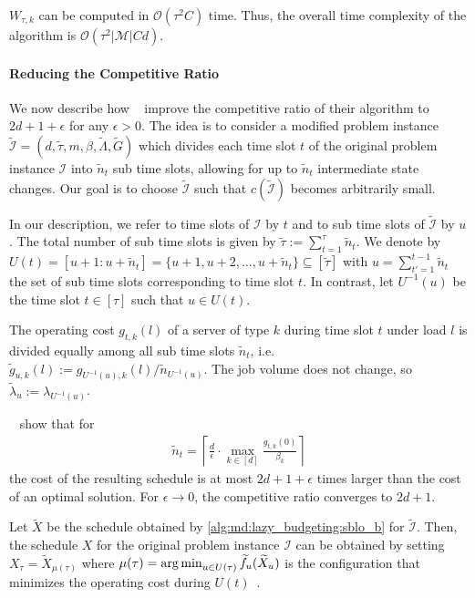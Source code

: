 $W_{\tau,k}$ can be computed in $\mathcal{O}(\tau^2 C)$ time. Thus, the overall time complexity of the algorithm is $\mathcal{O}(\tau^2 |\mathcal{M}| C d)$.

\paragraph{Reducing the Competitive Ratio}

We now describe how \citeauthor{Albers2021_2}~\cite{Albers2021_2} improve the competitive ratio of their algorithm to $2d + 1 + \epsilon$ for any $\epsilon > 0$. The idea is to consider a modified problem instance $\widetilde{\mathcal{I}} = (d, \widetilde{\tau}, m, \beta, \widetilde{\Lambda}, \widetilde{G})$ which divides each time slot $t$ of the original problem instance $\mathcal{I}$ into $\widetilde{n}_t$ sub time slots, allowing for up to $\widetilde{n}_t$ intermediate state changes. Our goal is to choose $\widetilde{\mathcal{I}}$ such that $c(\widetilde{\mathcal{I}})$ becomes arbitrarily small.

In our description, we refer to time slots of $\mathcal{I}$ by $t$ and to sub time slots of $\widetilde{\mathcal{I}}$ by $u$. The total number of sub time slots is given by $\widetilde{\tau} := \sum_{t=1}^{\tau} \widetilde{n}_t$. We denote by $U(t) = [u+1 : u+\widetilde{n}_t] = \{u+1, u+2, \dots, u+\widetilde{n}_t\} \subseteq [\widetilde{\tau}]$ with $u = \sum_{t'=1}^{t-1} \widetilde{n}_t$ the set of sub time slots corresponding to time slot $t$. In contrast, let $U^{-1}(u)$ be the time slot $t \in [\tau]$ such that $u \in U(t)$.

The operating cost $g_{t,k}(l)$ of a server of type $k$ during time slot $t$ under load $l$ is divided equally among all sub time slots $\widetilde{n}_t$, i.e. $\widetilde{g}_{u,k}(l) := g_{U^{-1}(u),k}(l) / \widetilde{n}_{U^{-1}(u)}$. The job volume does not change, so $\widetilde{\lambda}_u := \lambda_{U^{-1}(u)}$.

\citeauthor{Albers2021_2}~\cite{Albers2021_2} show that for \begin{align*}
    \widetilde{n}_t = \left\lceil\frac{d}{\epsilon} \cdot \max_{k \in [d]} \frac{g_{t,k}(0)}{\beta_k}\right\rceil
\end{align*} the cost of the resulting schedule is at most $2d + 1 + \epsilon$ times larger than the cost of an optimal solution. For $\epsilon \to 0$, the competitive ratio converges to $2d + 1$.

Let $\widetilde{X}$ be the schedule obtained by \cref{alg:md:lazy_budgeting:sblo_b} for $\widetilde{\mathcal{I}}$. Then, the schedule $X$ for the original problem instance $\mathcal{I}$ can be obtained by setting $X_{\tau} = \widetilde{X}_{\mu(\tau)}$ where $\mu(\tau) = \operatorname*{arg\,min}_{u \in U(\tau)} \widetilde{f}_{u}(\widetilde{X}_u)$ is the configuration that minimizes the operating cost during $U(t)$~\cite{Albers2021_2}.

